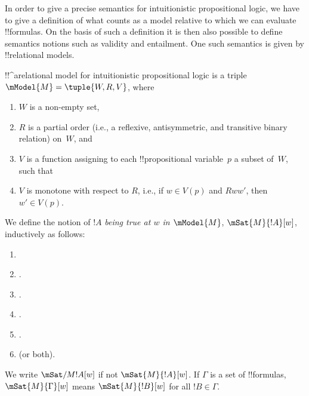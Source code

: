 \documentclass[../../../include/open-logic-section]{subfiles}
\begin{document}

In order to give a precise semantics for intuitionistic propositional
logic, we have to give a definition of what counts as a model relative
to which we can evaluate !!{formula}s. On the basis of such a
definition it is then also possible to define semantics notions such
as validity and entailment. One such semantics is given by
!!{relational model}s.

\begin{defn}
  !!^a{relational model} for intuitionistic propositional logic is a
  triple $\mModel{M} = \tuple{W, R, V}$, where
  \begin{enumerate}
  \item $W$ is a non-empty set,
  \item $R$ is a partial order (i.e., a reflexive, antisymmetric, and transitive binary relation) on~$W$, and
  \item $V$ is a function assigning to each !!{propositional
    variable}~$p$ a subset of~$W$, such that
  \item $V$ is monotone with respect to $R$, i.e., if $w
    \in V(p)$ and $Rww'$, then $w' \in V(p)$.
  \end{enumerate}
\end{defn}

\begin{defn}
  We define the notion of $!A$ \emph{being true at $w$ in
    $\mModel{M}$}, $\mSat{M}{!A}[w]$, inductively as follows:
  \begin{enumerate}
  \item {}
  \item {}.
  \item {}.
  \item {}.
  \item {}.
  \item {} (or both).
  \end{enumerate}
  We write $\mSat/{M}{!A}[w]$ if not $\mSat{M}{!A}[w]$. If $\Gamma$ is
  a set of !!{formula}s, $\mSat{M}{\Gamma}[w]$ means $\mSat{M}{!B}[w]$
  for all $!B \in \Gamma$.
\end{defn}
\end{document}
